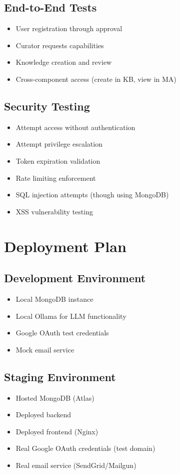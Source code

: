 \documentclass[12pt,a4paper]{article}
\begin{document}
\subsection{End-to-End Tests}
\begin{itemize}
    \item User registration through approval
    \item Curator requests capabilities
    \item Knowledge creation and review
    \item Cross-component access (create in KB, view in MA)
\end{itemize}

\subsection{Security Testing}
\begin{itemize}
    \item Attempt access without authentication
    \item Attempt privilege escalation
    \item Token expiration validation
    \item Rate limiting enforcement
    \item SQL injection attempts (though using MongoDB)
    \item XSS vulnerability testing
\end{itemize}

\section{Deployment Plan}

\subsection{Development Environment}
\begin{itemize}
    \item Local MongoDB instance
    \item Local Ollama for LLM functionality
    \item Google OAuth test credentials
    \item Mock email service
\end{itemize}

\subsection{Staging Environment}
\begin{itemize}
    \item Hosted MongoDB (Atlas)
    \item Deployed backend
    \item Deployed frontend (Nginx)
    \item Real Google OAuth credentials (test domain)
    \item Real email service (SendGrid/Mailgun)
\end{itemize}
\end{document}
